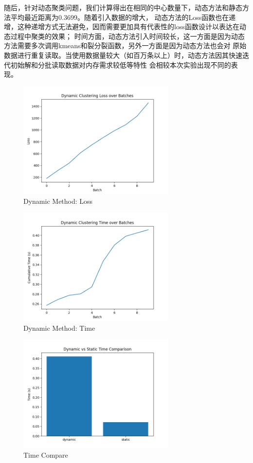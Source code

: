 \documentclass[12pt]{article}  %
\begin{document}
随后，针对动态聚类问题，我们计算得出在相同的中心数量下，动态方法和静态方法平均最近距离为0.3699。随着引入数据的增大，
动态方法的Loss函数也在递增，这种递增方式无法避免，因而需要更加具有代表性的loss函数设计以表达在动态过程中聚类的效果；
时间方面，动态方法引入时间较长，这一方面是因为动态方法需要多次调用kmeans和裂分裂函数，另外一方面是因为动态方法也会对
原始数据进行重复读取。当使用数据量较大（如百万条以上）时，动态方法因其快速迭代初始解和分批读取数据对内存需求较低等特性
会相较本次实验出现不同的表现。



\begin{figure}[htbp]
  \centering
  \includegraphics[width=0.7\textwidth]{dynLoss.png} %
  \caption{Dynamic Method: Loss}
\end{figure}

\begin{figure}[htbp]
  \centering
  \includegraphics[width=0.7\textwidth]{dynTime.png} %
  \caption{Dynamic Method: Time}
\end{figure}

\begin{figure}[htbp]
  \centering
  \includegraphics[width=0.7\textwidth]{TimeCompare.png} %
  \caption{Time Compare}
\end{figure}
\end{document}
